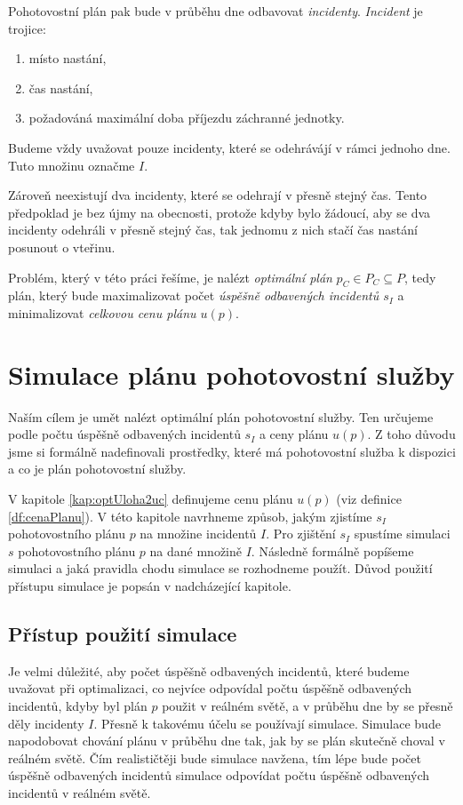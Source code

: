 Pohotovostní plán pak bude v průběhu dne odbavovat \textit{incidenty}.
\textit{Incident} je trojice:
\begin{enumerate}
  \item místo nastání,
  \item čas nastání,
  \item požadováná maximální doba příjezdu záchranné jednotky.
\end{enumerate}
Budeme vždy uvažovat pouze incidenty, které se odehrávájí v rámci jednoho dne. Tuto množinu označme $I$.

Zároveň neexistují dva incidenty, které se odehrají v přesně stejný čas.
Tento předpoklad je bez újmy na obecnosti, protože kdyby bylo žádoucí, aby se dva incidenty odehráli v přesně stejný čas,
tak jednomu z nich stačí čas nastání posunout o vteřinu.

Problém, který v této práci řešíme, je nalézt \textit{optimální plán} $p_C \in P_C \subseteq P$,
tedy plán,
který bude maximalizovat počet \textit{úspěšně odbavených incidentů $s_I$} a minimalizovat \textit{celkovou cenu plánu $u(p)$}.

\section{Simulace plánu pohotovostní služby}\label{SimulaceKap}

Naším cílem je umět nalézt optimální plán pohotovostní služby.
Ten určujeme podle počtu úspěšně odbavených incidentů $s_I$ a ceny plánu $u(p)$.
Z toho důvodu jsme si formálně nadefinovali prostředky, které má pohotovostní služba k dispozici a co je plán pohotovostní služby.

V kapitole \ref{kap:optUloha2uc} definujeme cenu plánu $u(p)$ (viz definice \ref{df:cenaPlanu}).
V této kapitole navrhneme způsob, jakým zjistíme $s_I$ pohotovostního plánu $p$ na množine incidentů $I$.
Pro zjištění $s_I$ spustíme simulaci $s$ pohotovostního plánu $p$ na dané množině $I$.
Následně formálně popíšeme simulaci a jaká pravidla chodu simulace se rozhodneme použít.
Důvod použití přístupu simulace je popsán v nadcházející kapitole.

\subsection{Přístup použití simulace}\label{kap:procSimulace}

Je velmi důležité, aby počet úspěšně odbavených incidentů, které budeme uvažovat při optimalizaci, co nejvíce odpovídal počtu úspěšně odbavených incidentů,
kdyby byl plán $p$ použit v reálném světě, a v průběhu dne by se přesně děly incidenty $I$.
Přesně k takovému účelu se používají simulace.
Simulace bude napodobovat chování plánu v průběhu dne tak, jak by se plán skutečně choval v reálném světě.
Čím realističtěji bude simulace navžena, tím lépe bude počet úspěšně odbavených incidentů simulace odpovídat
počtu úspěšně odbavených incidentů v reálném světě.

